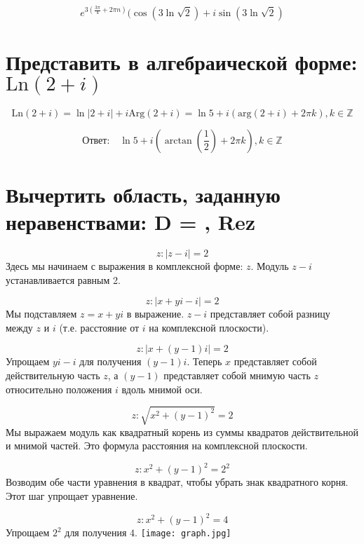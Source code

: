 \documentclass{article}
\begin{document}
	\[
		\boxed{e^{3(\frac{3\pi}{4} + 2\pi n)} (\cos(3\ln{\sqrt{2}}) + i\sin(3\ln{\sqrt{2}})}
	\]

	\newpage

	\section{Представить в алгебраической форме: $\text{Ln}(2+i)$}

	\[
		\text{Ln}(2+i) = \ln|2 + i| + i\text{Arg}(2+i) = \ln 5 + i\left(\text{arg}(2+
		i) + 2\pi k\right), k \in \mathbb{Z}
	\]

	\[
		\boxed{\text{Ответ:}\quad\ln 5 + i\left(\arctan(\frac{1}{2}) + 2\pi k\right), k \in \mathbb{Z}}
	\]

	\vspace{0.5cm}
	\section{Вычертить область, заданную неравенствами:
	\newline
	D = { , Rez }}

	\begin{enumerate}
		\[
			z: | z - i | = 2
		\]
		Здесь мы начинаем с выражения в комплексной форме: $z$.
		\newline
		Модуль $z - i$ устанавливается равным 2.

		\[
			z: | x + yi - i | = 2
		\]
		Мы подставляем $z = x + yi$ в выражение.
		\newline
		$z - i$ представляет собой разницу между $z$ и $i$ (т.е. расстояние от $i$ на
		комплексной плоскости).

		\[
			z: | x + (y - 1)i | = 2
		\]
		Упрощаем $yi - i$ для получения $(y - 1)i$.
		\newline
		Теперь $x$ представляет собой действительную часть $z$, а $(y - 1)$
		представляет собой мнимую часть $z$ относительно положения $i$ вдоль мнимой
		оси.

		\[
			z : \sqrt{x^{2} + (y - 1)^{2}}= 2
		\]
		Мы выражаем модуль как квадратный корень из суммы квадратов действительной и
		мнимой частей.
		\newline
		Это формула расстояния на комплексной плоскости.

		\[
			z : x^{2} + (y - 1)^{2} = 2^{2}
		\]
		Возводим обе части уравнения в квадрат, чтобы убрать знак квадратного корня.
		\newline
		Этот шаг упрощает уравнение.

		\[
			z : x^{2} + (y - 1)^{2} = 4
		\]
		Упрощаем $2^{2}$ для получения $4$.
		\newline
		\newline
		\vspace{0.5cm}
		\centering
		\texttt{[image: graph.jpg]}
		\centering
	\end{enumerate}
	\vspace{0.7cm}
	\newpage
\end{document}
